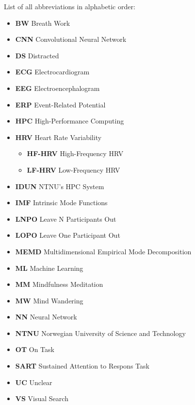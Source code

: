 
List of all abbreviations in alphabetic order:

\begin{itemize}
\item \textbf{BW} Breath Work
\item \textbf{CNN} Convolutional Neural Network
\item \textbf{DS} Distracted
\item \textbf{ECG} Electrocardiogram
\item \textbf{EEG} Electroencephalogram
\item \textbf{ERP} Event-Related Potential
\item \textbf{HPC} High-Performance Computing
\item \textbf{HRV} Heart Rate Variability
\begin{itemize}
            \item \textbf{HF-HRV} High-Frequency HRV
            \item \textbf{LF-HRV} Low-Frequency HRV
\end{itemize}
\item \textbf{IDUN} NTNU's HPC System
\item \textbf{IMF} Intrinsic Mode Functions
\item \textbf{LNPO} Leave N Participants Out
\item \textbf{LOPO} Leave One Participant Out
\item \textbf{MEMD} Multidimensional Empirical Mode Decomposition
\item \textbf{ML} Machine Learning
\item \textbf{MM} Mindfulness Meditation
\item \textbf{MW} Mind Wandering
\item \textbf{NN} Neural Network
\item \textbf{NTNU} Norwegian University of Science and Technology
\item \textbf{OT} On Task
\item \textbf{SART} Sustained Attention to Respons Task
\item \textbf{UC} Unclear
\item \textbf{VS} Visual Search

\end{itemize}